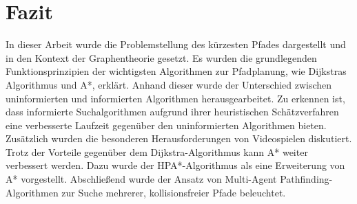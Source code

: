 \chapter{Fazit}

In dieser Arbeit wurde die Problemstellung des kürzesten Pfades dargestellt und in den Kontext der Graphentheorie gesetzt. Es wurden die grundlegenden Funktionsprinzipien der wichtigsten Algorithmen zur Pfadplanung, wie Dijkstras Algorithmus und A*, erklärt. Anhand dieser wurde der Unterschied zwischen uninformierten und informierten Algorithmen herausgearbeitet. Zu erkennen ist, dass informierte Suchalgorithmen aufgrund ihrer heuristischen Schätzverfahren eine verbesserte Laufzeit gegenüber den uninformierten Algorithmen bieten. Zusätzlich wurden die besonderen Herausforderungen von Videospielen diskutiert. Trotz der Vorteile gegenüber dem Dijkstra-Algorithmus kann A* weiter verbessert werden. Dazu wurde der HPA*-Algorithmus als eine Erweiterung von A* vorgestellt. Abschließend wurde der Ansatz von Multi-Agent Pathfinding-Algorithmen zur Suche mehrerer, kollisionsfreier Pfade beleuchtet.


